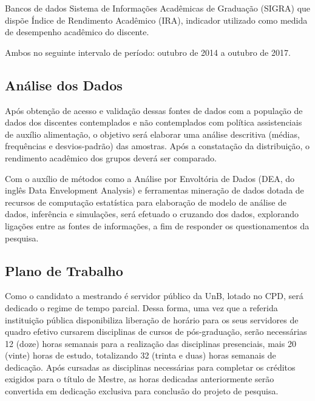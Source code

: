 Bancos de dados Sistema de Informações Acadêmicas de Graduação (SIGRA) que dispõe Índice de Rendimento Acadêmico (IRA), indicador utilizado como medida de desempenho acadêmico do discente. 

Ambos no seguinte intervalo de período: outubro de 2014 a outubro de 2017.


\subsection{Análise dos Dados}

Após obtenção de acesso e validação dessas fontes de dados com a população de dados dos discentes contemplados e não contemplados com política assistenciais de auxílio alimentação, o objetivo será elaborar uma análise descritiva (médias, frequências e desvios-padrão) das amostras. Após a constatação da distribuição, o rendimento acadêmico dos grupos deverá ser comparado. 

Com o auxílio de métodos como a Análise por Envoltória de Dados (DEA, do inglês Data Envelopment Analysis) e ferramentas mineração de dados dotada de recursos de computação estatística para elaboração de modelo de análise de dados, inferência e simulações, será efetuado o cruzando dos dados, explorando ligações entre as fontes de informações, a fim de responder os questionamentos da pesquisa.


\subsection{Plano de Trabalho}

Como o candidato a mestrando é servidor público da UnB, lotado no CPD, será dedicado o regime de tempo parcial. Dessa forma, uma vez que a referida instituição pública disponibiliza liberação de horário para os seus servidores de quadro efetivo cursarem disciplinas de cursos de pós-graduação, serão necessárias 12 (doze) horas semanais para a realização das disciplinas presenciais, mais 20 (vinte) horas de estudo, totalizando 32 (trinta e duas) horas semanais de dedicação. Após cursadas as disciplinas necessárias para completar os créditos exigidos para o título de Mestre, as horas dedicadas anteriormente serão convertida em dedicação exclusiva para conclusão do projeto de pesquisa.






